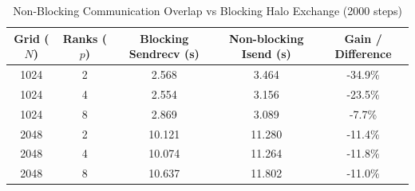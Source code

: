 \begin{table}[htbp]
\centering
\small
\caption{Non-Blocking Communication Overlap vs Blocking Halo Exchange (2000 steps)}
\label{tab:overlap}
\begin{tabular}{ccccc}
\hline
\textbf{Grid ($N$)} & \textbf{Ranks ($p$)} & \textbf{Blocking Sendrecv (s)} & \textbf{Non-blocking Isend (s)} & \textbf{Gain / Difference} \\
\hline
1024 & 2 & 2.568 & 3.464 & -34.9\% \\
1024 & 4 & 2.554 & 3.156 & -23.5\% \\
1024 & 8 & 2.869 & 3.089 & -7.7\% \\
2048 & 2 & 10.121 & 11.280 & -11.4\% \\
2048 & 4 & 10.074 & 11.264 & -11.8\% \\
2048 & 8 & 10.637 & 11.802 & -11.0\% \\
\hline
\end{tabular}
\end{table}
